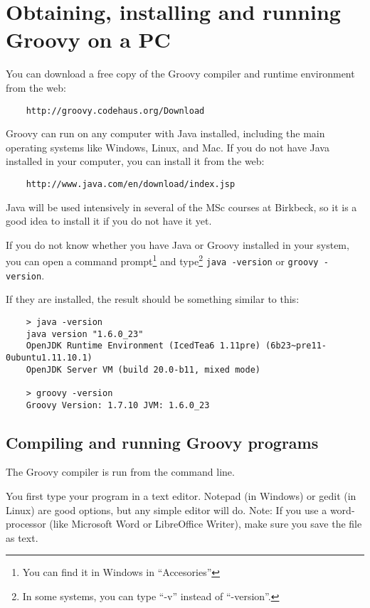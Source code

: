 \section{Obtaining, installing and running Groovy on a PC}
\label{sec:obta-inst-runn}
 
You can download a free copy of the Groovy compiler and runtime environment 
from the web:

\begin{verbatim}
    http://groovy.codehaus.org/Download
\end{verbatim}

Groovy can run on any computer with Java installed, including the main
operating systems like Windows, Linux, and Mac. If you do not have
Java installed in your computer, you can install it from the web:

\begin{verbatim}
    http://www.java.com/en/download/index.jsp
\end{verbatim}

Java will be used intensively in several of the MSc courses 
at Birkbeck, so it is a good idea to install it if you do not have it
yet.

If you do not know whether you have Java or Groovy installed in your
system, you can open a command prompt\footnote{You can find it in Windows in
  ``Accesories''} and type\footnote{In some systems, you can type
  ``-v'' instead of ``-version''.} \verb+java -version+ 
or \verb+groovy -version+. 

If they are installed, the result should be something similar to this:

\begin{verbatim}
    > java -version
    java version "1.6.0_23"
    OpenJDK Runtime Environment (IcedTea6 1.11pre) (6b23~pre11-0ubuntu1.11.10.1)
    OpenJDK Server VM (build 20.0-b11, mixed mode)

    > groovy -version
    Groovy Version: 1.7.10 JVM: 1.6.0_23
\end{verbatim}



\subsection*{Compiling and running Groovy programs}

The Groovy compiler is run from the command line.

You first type your program in a text editor. Notepad (in Windows) or
gedit (in Linux) are good options, but any simple editor will
do. Note: If you use a word-processor (like Microsoft Word or
LibreOffice Writer), make sure you save the file as text.

